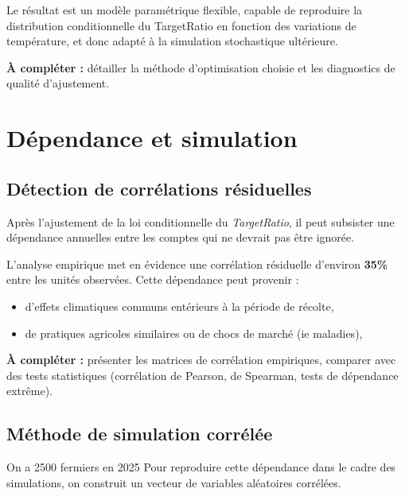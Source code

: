 \documentclass[11pt,a4paper,openright,twoside]{report}
\begin{document}
Le résultat est un modèle paramétrique flexible, capable de reproduire la distribution conditionnelle du TargetRatio en fonction des variations de température, et donc adapté à la simulation stochastique ultérieure.

\textbf{À compléter :} détailler la méthode d’optimisation choisie et les diagnostics de qualité d’ajustement.

\chapter{Dépendance et simulation}

\section{Détection de corrélations résiduelles}
Après l’ajustement de la loi conditionnelle du \textit{TargetRatio}, il peut subsister une dépendance annuelles entre les comptes qui ne devrait pas être ignorée.  

L’analyse empirique met en évidence une corrélation résiduelle d’environ \textbf{35\%} entre les unités observées.  
Cette dépendance peut provenir :
\begin{itemize}
    \item d’effets climatiques communs entérieurs à la période de récolte,
    \item de pratiques agricoles similaires ou de chocs de marché (ie maladies),
\end{itemize}

\textbf{À compléter :} présenter les matrices de corrélation empiriques, comparer avec des tests statistiques (corrélation de Pearson, de Spearman, tests de dépendance extrême).

\section{Méthode de simulation corrélée}
On a 2500 fermiers en 2025
Pour reproduire cette dépendance dans le cadre des simulations, on construit un vecteur de variables aléatoires corrélées.  
\end{document}
